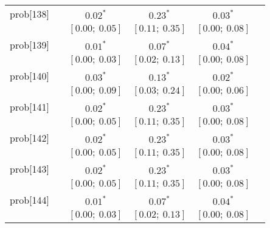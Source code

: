 \begin{table}
\begin{center}
\begin{tabular}{l c c c c c }
prob[138]   &                                  & $0.02^{*}$                & $0.23^{*}$                & $0.03^{*}$              &                         \\
            &                                  & $[0.00;\ 0.05]$           & $[0.11;\ 0.35]$           & $[0.00;\ 0.08]$         &                         \\
prob[139]   &                                  & $0.01^{*}$                & $0.07^{*}$                & $0.04^{*}$              &                         \\
            &                                  & $[0.00;\ 0.03]$           & $[0.02;\ 0.13]$           & $[0.00;\ 0.08]$         &                         \\
prob[140]   &                                  & $0.03^{*}$                & $0.13^{*}$                & $0.02^{*}$              &                         \\
            &                                  & $[0.00;\ 0.09]$           & $[0.03;\ 0.24]$           & $[0.00;\ 0.06]$         &                         \\
prob[141]   &                                  & $0.02^{*}$                & $0.23^{*}$                & $0.03^{*}$              &                         \\
            &                                  & $[0.00;\ 0.05]$           & $[0.11;\ 0.35]$           & $[0.00;\ 0.08]$         &                         \\
prob[142]   &                                  & $0.02^{*}$                & $0.23^{*}$                & $0.03^{*}$              &                         \\
            &                                  & $[0.00;\ 0.05]$           & $[0.11;\ 0.35]$           & $[0.00;\ 0.08]$         &                         \\
prob[143]   &                                  & $0.02^{*}$                & $0.23^{*}$                & $0.03^{*}$              &                         \\
            &                                  & $[0.00;\ 0.05]$           & $[0.11;\ 0.35]$           & $[0.00;\ 0.08]$         &                         \\
prob[144]   &                                  & $0.01^{*}$                & $0.07^{*}$                & $0.04^{*}$              &                         \\
            &                                  & $[0.00;\ 0.03]$           & $[0.02;\ 0.13]$           & $[0.00;\ 0.08]$         &                         \\

\end{tabular}
\end{center}
\end{table}
